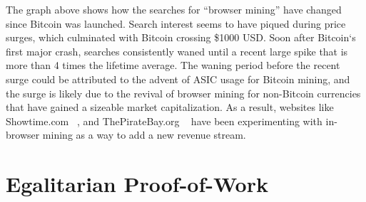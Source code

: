 The graph above shows how the searches for ``browser mining'' have changed since Bitcoin was launched. Search interest seems to have piqued during price surges, which culminated with Bitcoin crossing \$1000 USD. Soon after Bitcoin`s first major crash, searches consistently waned until a recent large spike that is more than 4 times the lifetime average. The waning period before the recent surge could be attributed to the advent of ASIC usage for Bitcoin mining, and the surge is likely due to the revival of browser mining for non-Bitcoin currencies that have gained a sizeable market capitalization. As a result, websites like Showtime.com ~\cite{showtimehive}, and ThePirateBay.org ~\cite{piratesbayhive} have been experimenting with in-browser mining as a way to add a new revenue stream.

\section{Egalitarian Proof-of-Work}

